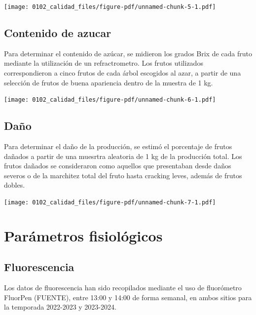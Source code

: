 \documentclass[
  letterpaper,
  DIV=11,
  numbers=noendperiod]{scrreprt}
\begin{document}
\begin{center}
\texttt{[image: 0102\_calidad\_files/figure-pdf/unnamed-chunk-5-1.pdf]}
\end{center}

\section{Contenido de azucar}\label{contenido-de-azucar}

Para determinar el contenido de azúcar, se midieron los grados Brix de
cada fruto mediante la utilización de un refractrometro. Los frutos
utilizados correspondieron a cinco frutos de cada árbol escogidos al
azar, a partir de una selección de frutos de buena apariencia dentro de
la muestra de 1 kg.

\begin{center}
\texttt{[image: 0102\_calidad\_files/figure-pdf/unnamed-chunk-6-1.pdf]}
\end{center}

\section{Daño}\label{dauxf1o}

Para determinar el daño de la producción, se estimó el porcentaje de
frutos dañados a partir de una muesrtra aleatoria de 1 kg de la
producción total. Los frutos dañados se consideraron como aquellos que
presentaban desde daños severos o de la marchitez total del fruto hasta
cracking leves, además de frutos dobles.

\begin{center}
\texttt{[image: 0102\_calidad\_files/figure-pdf/unnamed-chunk-7-1.pdf]}
\end{center}

\chapter{Parámetros fisiológicos}\label{paruxe1metros-fisioluxf3gicos}

\section{Fluorescencia}\label{fluorescencia}

Los datos de fluorescencia han sido recopilados mediante el uso de
fluorómetro FluorPen (FUENTE), entre 13:00 y 14:00 de forma semanal, en
ambos sitios para la temporada 2022-2023 y 2023-2024.
\end{document}

